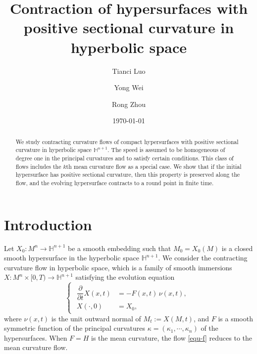 \documentclass[11pt,reqno]{amsart}
\theoremstyle{remark}
\numberwithin{equation}{section}
\begin{document}
\title[Contraction of hypersurfaces with positive sectional curvature]{Contraction of hypersurfaces with positive sectional curvature in hyperbolic space}

\address{School of Mathematical Sciences, University of Science and Technology of China, Hefei 230026, P.R. China}
\author[T. Luo]{Tianci Luo}
\author[Y. Wei]{Yong Wei}
\author[R. Zhou]{Rong Zhou}


\date{\today}

\begin{abstract}
	We study contracting curvature flows of compact hypersurfaces with positive sectional curvature in hyperbolic space $\mathbb{H}^{n+1}$. The speed is assumed to be homogeneous of degree one in the principal curvatures and to satisfy certain conditions. This class of flows includes the $k$th mean curvature flow as a special case. We show that if the initial hypersurface has positive sectional curvature, then this property is preserved along the flow, and the evolving hypersurface contracts to a round point in finite time. 
\end{abstract}



\maketitle
\tableofcontents



\section{Introduction}

Let $X_0:M^n\to\mathbb{H}^{n+1}$ be a smooth embedding such that $M_0=X_0(M)$ is a closed smooth hypersurface in the hyperbolic space $\mathbb{H}^{n+1}$. We consider the contracting curvature flow in hyperbolic space, which is a family of smooth immersions $X:M^n \times [0,T)\to \mathbb{H}^{n+1}$ satisfying the evolution equation
\begin{equation}
	\label{equ-f}
	\begin{cases}
		\begin{aligned}
			\dfrac{\partial}{\partial t}X(x,t) & = -F(x,t)\,\nu(x,t), \\
			X(\cdot,0) & = X_0,
		\end{aligned}
	\end{cases}
\end{equation}
where $\nu(x,t)$ is the unit outward normal of $M_t:=X(M,t)$, and $F$ is a smooth symmetric function of the principal curvatures $\kappa=(\kappa_1,\cdots,\kappa_n)$ of the hypersurfaces.  When $F=H$ is the mean curvature, the flow \eqref{equ-f} reduces to the mean curvature flow. 
\end{document}
